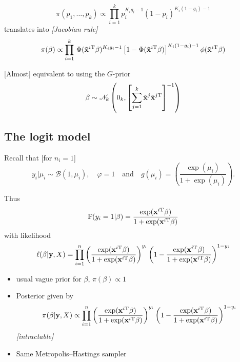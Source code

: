 \begin{slide}

$$
\pi(p_1,\ldots,p_k)\propto \prod_{i=1}^kp_i^{K_ig_i-1}(1-p_i)^{K_i(1-g_i)-1}
$$
translates into {\em [Jacobian rule]}
$$
\pi(\beta)\propto \prod_{i=1}^k\,\Phi(\tilde {\mathbf{x}}^{i\mathrm{T}}
\beta)^{K_ig_i-1}\left[ 1-\Phi(\tilde {\mathbf{x}}^{i\mathrm{T}}
\beta)\right]^{K_i(1-g_i)-1}\phi(\tilde {\mathbf{x}}^{i\mathrm{T}}\beta)
$$

\vs\pause

[Almost] equivalent to using the $G$-prior\footnotesize
$$
\beta\sim\mathscr{N}_k\left(0_k,\left[\sum_{j=1}^k \tilde
{\mathbf{x}}^j\tilde {\mathbf{x}}^{j\mathrm{T}}\right]^{-1}\right)
$$\normalsize

\end{slide}
\subsection{The logit model}\begin{slide}

Recall that [for $n_i=1$]
$$
y_i|\mu_i\sim\mathscr{B}(1,\mu_i),\quad \varphi=1
\quad\text{and}\quad
g(\mu_i)=\left(\frac{\exp(\mu_i)}{1+\exp(\mu_i)}\right).
$$

Thus
$$
\mathbb{P}(y_i=1|\beta)=\frac{\exp(\mathbf{x}^{i\mathrm{T}}\beta)}{1+\exp(\mathbf{x}^{i\mathrm{T}}\beta)}
$$
with likelihood 
\small$$
\ell(\beta|\mathbf{y},X)=\prod_{i=1}^n\left(\frac{\exp(\mathbf{x}^{i\mathrm{T}}\beta)}{1+\exp(\mathbf{x}^{i\mathrm{T}}\beta)}\right)^{y_i}
\left(1-\frac{\exp(\mathbf{x}^{i\mathrm{T}}\beta)}{1+\exp(\mathbf{x}^{i\mathrm{T}}\beta)}\right)^{1-y_i}
$$\normalsize

\end{slide}\begin{slide}

\begin{itemize}
\item usual vague prior for $\beta$, $\pi(\beta)\propto 1$

\pause
\item Posterior given by
$$
\pi(\beta|\mathbf{y},X) \propto \prod_{i=1}^n\left(\frac{\exp(\mathbf{x}^{i\mathrm{T}}\beta)}{1+\exp(\mathbf{x}^{i\mathrm{T}}\beta)}\right)^{y_i}
\left(1-\frac{\exp(\mathbf{x}^{i\mathrm{T}}\beta)}{1+\exp(\mathbf{x}^{i\mathrm{T}}\beta)}\right)^{1-y_i}
$$
{\em [intractable]}

\pause
\item Same Metropolis--Hastings sampler
\end{itemize}
\end{slide}\begin{slide}


\end{slide}
